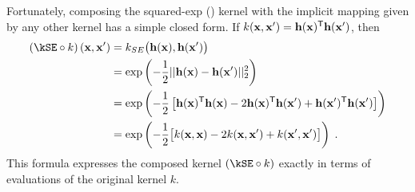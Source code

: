 \documentclass{article} %
\begin{document}
Fortunately, composing the squared-exp (\kSE{}) kernel with the implicit mapping given by any other kernel has a simple closed form.
If $k({\bf{x}}, {\bf{x}}') = {\bf{h}}({\bf{x}})^{\mathsf{T}} {\bf{h}}({\bf{x}}')$, then
%
\begin{align}
\left( \kSE \circ k \right) \left( \vx, \vx' \right) & = k_{SE} \big( \hPhi(\vx), \hPhi(\vx') \big) \\
& = \exp \left( -\frac{1}{2} || \hPhi(\vx) - \hPhi(\vx')||_2^2 \right) \\
& = \exp\left ( -\frac{1}{2} \left[ \hPhi(\vx) \tra \hPhi(\vx) - 2 \hPhi(\vx) \tra \hPhi(\vx') + \hPhi(\vx') \tra \hPhi(\vx') \right] \right)  \\
& = \exp \left( -\frac{1}{2} \big[ k(\vx, \vx) - 2 k(\vx, \vx') + k(\vx', \vx') \big] \right) \; .
\end{align}
%
%
%
This formula expresses the composed kernel $(\kSE \circ k)$ exactly in terms of evaluations of the original kernel $k$.
\end{document}
